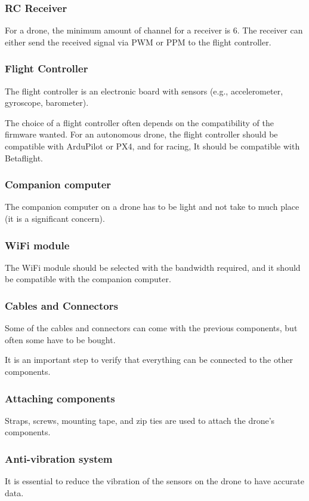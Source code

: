 \subsubsection{RC Receiver}
For a drone, the minimum amount of channel for a receiver is 6.
The receiver can either send the received signal via PWM or PPM to the flight controller.

\subsubsection{Flight Controller}
The flight controller is an electronic board with sensors (e.g., accelerometer, gyroscope, barometer).

The choice of a flight controller often depends on the compatibility of the firmware wanted. For an autonomous drone, the flight controller should be compatible with ArduPilot or PX4, and for racing, It should be compatible with Betaflight.

\subsubsection{Companion computer}
The companion computer on a drone has to be light and not take to much place (it is a significant concern).

\subsubsection{WiFi module}
The WiFi module should be selected with the bandwidth required, and it should be compatible with the companion computer.

\subsubsection{Cables and Connectors}
Some of the cables and connectors can come with the previous components, but often some have to be bought.

It is an important step to verify that everything can be connected to the other components.

\subsubsection{Attaching components}
Straps, screws, mounting tape, and zip ties are used to attach the drone's components.

\subsubsection{Anti-vibration system}
It is essential to reduce the vibration of the sensors on the drone to have accurate data.


